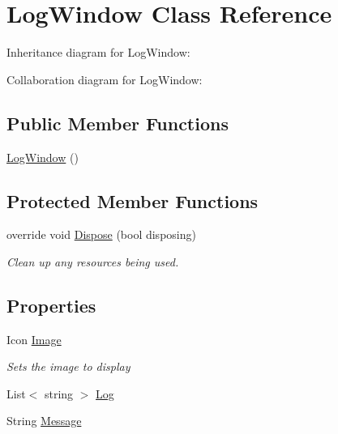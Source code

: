 \hypertarget{class_m_p_f_s21_1_1_log_window}{}\section{Log\+Window Class Reference}
\label{class_m_p_f_s21_1_1_log_window}


Inheritance diagram for Log\+Window\+:


Collaboration diagram for Log\+Window\+:
\subsection*{Public Member Functions}
\begin{DoxyCompactItemize}
\item 
\hyperlink{class_m_p_f_s21_1_1_log_window_afe4c08efd8120b69c4bc12ce8f61869d}{Log\+Window} ()
\end{DoxyCompactItemize}
\subsection*{Protected Member Functions}
\begin{DoxyCompactItemize}
\item 
override void \hyperlink{class_m_p_f_s21_1_1_log_window_a849c3c7f8d08104f0cdb46bee9fe6389}{Dispose} (bool disposing)
\begin{DoxyCompactList}\small\item\em Clean up any resources being used. \end{DoxyCompactList}\end{DoxyCompactItemize}
\subsection*{Properties}
\begin{DoxyCompactItemize}
\item 
Icon \hyperlink{class_m_p_f_s21_1_1_log_window_a486ada6aa6732a5d569ae1cda3d7b429}{Image}
\begin{DoxyCompactList}\small\item\em Sets the image to display \end{DoxyCompactList}\item 
List$<$ string $>$ \hyperlink{class_m_p_f_s21_1_1_log_window_a06712a1c8dec792865a961869c7acf59}{Log}
\item 
String \hyperlink{class_m_p_f_s21_1_1_log_window_a511236ef77d83eeff6ae4e6ae198b451}{Message}
\end{DoxyCompactItemize}



